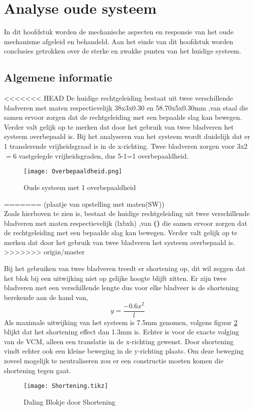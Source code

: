 \documentclass[a4paper]{article}
\begin{document}
\section{Analyse oude systeem}
In dit hoofdstuk worden de mechanische aspecten en responsie van het oude mechanisme afgeleid en behandeld. Aan het einde van dit hoofdstuk worden conclusies getrokken over de sterke en zwakke punten van het huidige systeem.

\subsection{Algemene informatie}
<<<<<<< HEAD
De huidige rechtgeleiding bestaat uit twee verschillende bladveren met maten respectievelijk 38x3x0.30 en 58.70x5x0.30mm ,van staal die samen ervoor zorgen dat de rechtgeleiding met een bepaalde slag kan bewegen. Verder valt gelijk op te merken dat door het gebruik van twee bladveren het systeem overbepaald is. Bij het analyseren van het systeem wordt duidelijk dat er 1  translerende vrijheidsgraad is in de x-richting. Twee bladveren zorgen voor 3x2$=$6 vastgelegde vrijheidsgraden, dus 5-1=1 overbepaaldheid. 

\begin{figure}[h]
\label{Overbepaaldheid}
\centering
\setlength\figureheight{5cm}
\setlength{}
\texttt{[image: Overbepaaldheid.png]}
\caption{Oude systeem met 1 overbepaaldheid}
\end{figure}

=======
(plaatje van opstelling met maten(SW)) \\
Zoals hierboven te zien is, bestaat de huidige rechtgeleiding uit twee verschillende bladveren met maten respectievelijk (lxbxh) ,van \textbf{()} die samen ervoor zorgen dat de rechtgeleiding met een bepaalde slag kan bewegen. Verder valt gelijk op te merken dat door het gebruik van twee bladveren het systeem overbepaald is.
>>>>>>> origin/master

Bij het gebruiken van twee bladveren treedt er shortening op, dit wil zeggen dat het blok bij een uitwijking niet op gelijke hoogte blijft zitten. Er zijn twee bladveren met een verschillende lengte dus voor elke bladveer is de shortening berekende aan de hand van,
\begin{equation}
y=\frac{-0.6x^2}{l}
\end{equation}
Als maximale uitwijking van het systeem is 7.5mm genomen, volgens figuur \ref{Shortening} blijkt dat het shortening effect dan 1.3mm is. Echter is voor de exacte volging van de VCM, alleen een translatie in de x-richting gewenst. Door shortening vindt echter ook een kleine beweging in de y-richting plaats. Om deze beweging zoveel mogelijk te neutraliseren zou er een constructie moeten komen die shortening tegen gaat. 
\begin{figure}[h]
\label{Shortening}
\centering
\setlength\figureheight{5cm}
\setlength{}
\texttt{[image: Shortening.tikz]}
\caption{Daling Blokje door Shortening}
\end{figure}
\end{document}
